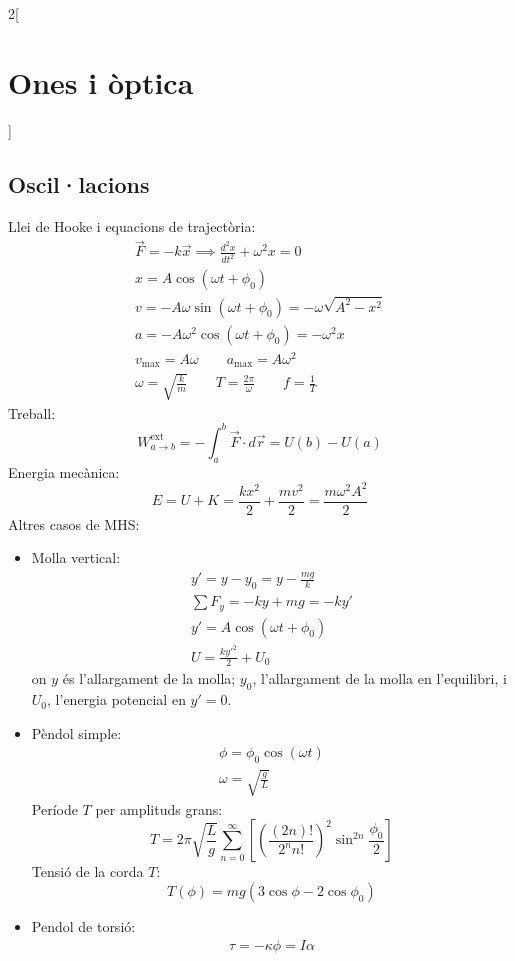 \documentclass[class=article,10pt,crop=false]{standalone}
\begin{document}
\begin{multicols}{2}[\section{Ones i òptica}]
\subsection{Oscil·lacions}
Llei de Hooke i equacions de trajectòria:
\begin{gather*}
    \Vec{F}=-k\Vec{x}\implies\frac{d^2x}{dt^2}+\omega^2x=0\\
    x=A\cos(\omega t+\phi_0)\\
    v=-A\omega\sin(\omega t+\phi_0)=-\omega\sqrt{A^2-x^2}\\
    a=-A\omega^2\cos(\omega t+\phi_0)=-\omega^2x\\
    v_\text{max}=A\omega\qquad a_\text{max}=A\omega^2\\
    \omega=\sqrt{\frac{k}{m}}\qquad T=\frac{2\pi}{\omega}\qquad f=\frac{1}{T}
\end{gather*}
Treball: $$W_{a\to b}^\text{ext}=-\int_a^b\Vec{F}\cdot d\Vec{r}=U(b)-U(a)$$
Energia mecànica: $$E=U+K=\frac{kx^2}{2}+\frac{mv^2}{2}=\frac{m\omega^2A^2}{2}$$
Altres casos de MHS:
\begin{itemize}
    \item Molla vertical:
    \begin{gather*}
        y'=y-y_0=y-\frac{mg}{k}\\
        \sum F_y=-ky+mg=-ky'\\
        y'=A\cos(\omega t+\phi_0)\\
        U=\frac{ky'^2}{2}+U_0
    \end{gather*}
    {\footnotesize on $y$ és l'allargament de la molla; $y_0$, l'allargament de la molla en l'equilibri, i $U_0$, l'energia potencial en $y'=0$.}
    \item Pèndol simple:
    \begin{gather*}
        \phi=\phi_0\cos(\omega t)\\
        \omega=\sqrt{\frac{g}{L}}
    \end{gather*}
    Període $T$ per amplituds grans:
    $$T=2\pi\sqrt{\frac{L}{g}}\sum_{n=0}^\infty\left[\left(\frac{(2n)!}{2^nn!}\right)^2\sin^{2n}\frac{\phi_0}{2}\right]$$
    Tensió de la corda $T$: $$T(\phi)=mg(3\cos\phi-2\cos\phi_0)$$
    \item Pendol de torsió:
    \begin{gather*}
        \tau=-\kappa\phi=I\alpha\\

\end{gather*}
\end{itemize}
\end{multicols}
\end{document}
